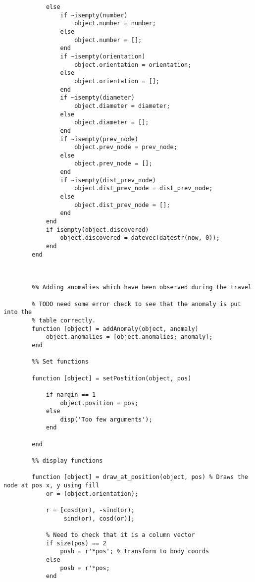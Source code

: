 \begin{lstlisting}
            else
                if ~isempty(number)
                    object.number = number;
                else
                    object.number = [];
                end
                if ~isempty(orientation)
                    object.orientation = orientation;
                else
                    object.orientation = [];
                end
                if ~isempty(diameter)
                    object.diameter = diameter;
                else
                    object.diameter = [];
                end
                if ~isempty(prev_node)
                    object.prev_node = prev_node;
                else
                    object.prev_node = [];
                end
                if ~isempty(dist_prev_node)
                    object.dist_prev_node = dist_prev_node;
                else
                    object.dist_prev_node = [];
                end
            end 
            if isempty(object.discovered)
                object.discovered = datevec(datestr(now, 0));
            end
        end
        
        
        
        %% Adding anomalies which have been observed during the travel
        
        % TODO need some error check to see that the anomaly is put into the 
        % table correctly.
        function [object] = addAnomaly(object, anomaly)
            object.anomalies = [object.anomalies; anomaly];
        end
        
        %% Set functions
 
        function [object] = setPostition(object, pos)
            
            if nargin == 1
                object.position = pos;
            else
                disp('Too few arguments');
            end
            
        end
       
        %% display functions
        
        function [object] = draw_at_position(object, pos) % Draws the node at pos x, y using fill
            or = (object.orientation);
            
            r = [cosd(or), -sind(or);
                 sind(or), cosd(or)];
        
            % Need to check that it is a column vector
            if size(pos) == 2 
                posb = r'*pos'; % transform to body coords
            else
                posb = r'*pos;
            end
            

\end{lstlisting}
